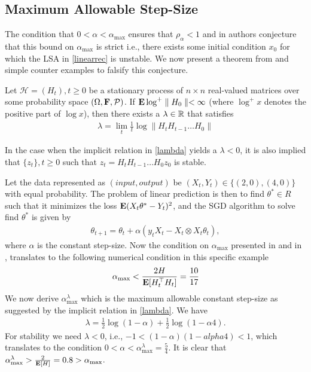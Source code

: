 \subsection{Maximum Allowable Step-Size}\label{opti}
The condition that $0<\alpha<\alpha_{\max}$ ensures that $\rho_{\alpha}<1$ and in \cite{bachaistats} authors conjecture that this bound on $\alpha_{\max}$ is strict i.e., there exists some initial condition $x_0$ for which the LSA in \eqref{linearrec} is unstable. We now present a theorem from \cite{logexp} and simple counter examples to falsify this conjecture.
\begin{theorem}\label{explog}
Let $\mathcal{H}=(H_t), t\geq 0$ be a stationary process of $n\times n$ real-valued matrices over some probability space $(\Omega,\mathbf{F},\mathcal{P})$. If $\mathbf{E}\log^+\parallel H_0\parallel<\infty$ (where $\log^+ x$ denotes the positive part of $\log x$), then there exists a $\lambda\in \mathbb{R}$ that satisfies
\begin{align}\label{lambda}
\lambda=\lim_{t}\frac{1}{t}\log\parallel H_t H_{t-1}\ldots H_0\parallel
\end{align}
\end{theorem}
In the case when the implicit relation in \eqref{lambda} yields a $\lambda<0$, it is also implied that $\{z_t\},t\geq 0$ such that $z_t=H_t H_{t-1}\ldots H_0z_0$ is stable.
\begin{example}
Let the data represented as $(input,output)$ be $(X_t,Y_t)\in \{(2,0), (4,0)\}$ with equal probability. The problem of linear prediction is then to find $\theta^*\in R$ such that it minimizes the loss $\mathbf{E}(X_t \theta^* -Y_t)^2$, and the SGD algorithm to solve find $\theta^*$ is given by
\begin{align}
\theta_{t+1}=\theta_t+\alpha(y_t X_t-X_t\otimes X_t\theta_t),
\end{align}
where $\alpha$ is the constant step-size. Now the condition on $\alpha_{\max}$ presented in  and in \cite{bachaistats}, translates to the following numerical condition in this specific example
\begin{align*}
\alpha_{\max}<\frac{2H}{\mathbf{E}[H_t^\top H_t]}=\frac{10}{17}
\end{align*}
We now derive $\alpha^{\lambda}_{\max}$ which is the maximum allowable constant step-size as suggested by the implicit relation in \eqref{lambda}. We have
\begin{align}
\lambda=\frac{1}{2}\log(1-\alpha)+\frac{1}{2}\log(1-\alpha 4).
\end{align}
For stability we need $\lambda<0$, i.e., $-1<(1-\alpha)(1-alpha 4)<1$, which translates to the condition $0<\alpha<\alpha^{\lambda}_{\max}=\frac{5}{4}$. It is clear that $\alpha^{\lambda}_{\max}>\frac{2}{\mathbf{E}[H]}=0.8>\alpha_{\max}$.
\end{example}
